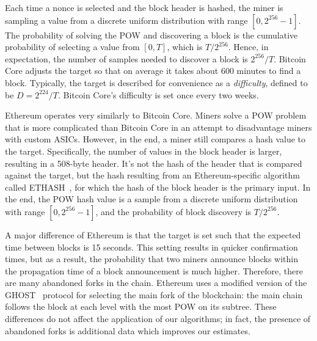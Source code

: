 Each time a nonce is selected and the block
header is hashed, the miner is sampling a value from a discrete uniform
distribution with range $[0,2^{256}-1]$. The probability of solving the POW and
discovering a block is the cumulative probability of selecting a value
from $[0,T]$, which is $T/{2^{256}}$. Hence, in expectation, the
number of samples needed to discover a block is ${2^{256}/T}$. Bitcoin Core
adjusts the target so that on average it takes about 600 minutes to
find a block. Typically, the target is described for convenience as a
{\em difficulty}, defined to be $D=2^{224}/T$. Bitcoin Core's difficulty
is set once every two weeks.

 Ethereum operates very similarly to Bitcoin Core. Miners solve a POW problem that is more complicated
than Bitcoin Core in an attempt to disadvantage miners with custom ASICs.
However, in the end, a miner still compares a hash value to the target.
Specifically, the number of values in the block header is larger,
resulting in a 508-byte header. It's not the hash of the header that
is compared against the target, but the hash resulting from an
Ethereum-specific algorithm called ETHASH~\cite{ETHASH}, for which the
hash of the block header is the primary input. In the end, the POW
hash value is a sample from a discrete uniform distribution with range
$[0,2^{256}-1]$, and the probability of block discovery is
${T/2^{256}}$.

A major difference of Ethereum is that the target is set such that the
expected time between blocks is 15 seconds. This setting results
in quicker confirmation times, but as a result, the probability that two
miners announce blocks within the propagation time of a block
announcement is much higher. Therefore, there are many abandoned
forks in the chain. Ethereum uses a modified version of the GHOST~\cite{Sompolinsky:2015}
protocol for selecting the main fork of the blockchain: the main chain
follows the block at each level with the most POW on its subtree.
These differences do not affect the application of our algorithms; in
fact, the presence of abandoned forks is additional data which improves our
estimates.


